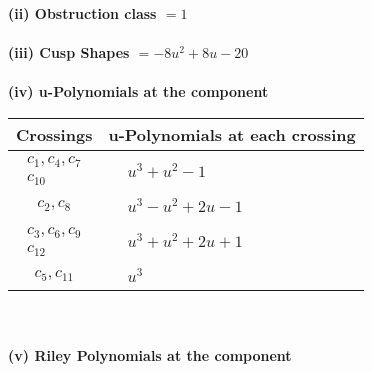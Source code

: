 \documentclass[1p]{elsarticle_modified}
\theoremstyle{definition}
\begin{document}
\flushleft \textbf{(ii) Obstruction class $= 1$}\\~\\
\flushleft \textbf{(iii) Cusp Shapes $= -8 u^2+8 u-20$}\\~\\
\newpage\renewcommand{\arraystretch}{1}
\flushleft \textbf{(iv) u-Polynomials at the component}\newline \\
\begin{tabular}{m{50pt}|m{274pt}}
Crossings & \hspace{64pt}u-Polynomials at each crossing \\
\hline $$\begin{aligned}c_{1},c_{4},c_{7}\\c_{10}\end{aligned}$$&$\begin{aligned}
&u^3+u^2-1
\end{aligned}$\\
\hline $$\begin{aligned}c_{2},c_{8}\end{aligned}$$&$\begin{aligned}
&u^3- u^2+2 u-1
\end{aligned}$\\
\hline $$\begin{aligned}c_{3},c_{6},c_{9}\\c_{12}\end{aligned}$$&$\begin{aligned}
&u^3+u^2+2 u+1
\end{aligned}$\\
\hline $$\begin{aligned}c_{5},c_{11}\end{aligned}$$&$\begin{aligned}
&u^3
\end{aligned}$\\
\hline
\end{tabular}\\~\\
\newpage\renewcommand{\arraystretch}{1}
\flushleft \textbf{(v) Riley Polynomials at the component}\newline \\
\end{document}
